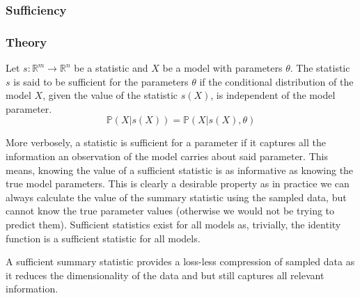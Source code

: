 \documentclass[11pt,a4paper,margin=0]{article}
\newcommand*{\prob}{\mathbb{P}}
\theoremstyle{break}
\begin{document}
\subsubsection{Sufficiency}\label{sec_sufficiency}

\subsubsection*{Theory}

  \begin{box_definition}\label{def_sufficient_statistic}
    Let $s:\mathbb{R}^m\to\mathbb{R}^n$ be a statistic and $X$ be a model with parameters $\theta$. The statistic $s$ is said to be sufficient for the parameters $\theta$ if the conditional distribution of the model $X$, given the value of the statistic $s(X)$, is independent of the model parameter. \cite[]{dictionary_of_statistical_terms}
    \[ \prob(X|s(X))=\prob(X|s(X),\theta) \]
  \end{box_definition}

  More verbosely, a statistic is sufficient for a parameter if it captures all the information an observation of the model carries about said parameter. This means, knowing the value of a sufficient statistic is as informative as knowing the true model parameters. This is clearly a desirable property as in practice we can always calculate the value of the summary statistic using the sampled data, but cannot know the true parameter values (otherwise we would not be trying to predict them). Sufficient statistics exist for all models as, trivially, the identity function is a sufficient statistic for all models.

  \par A sufficient summary statistic provides a loss-less compression of sampled data as it reduces the dimensionality of the data and but still captures all relevant information.
\end{document}
